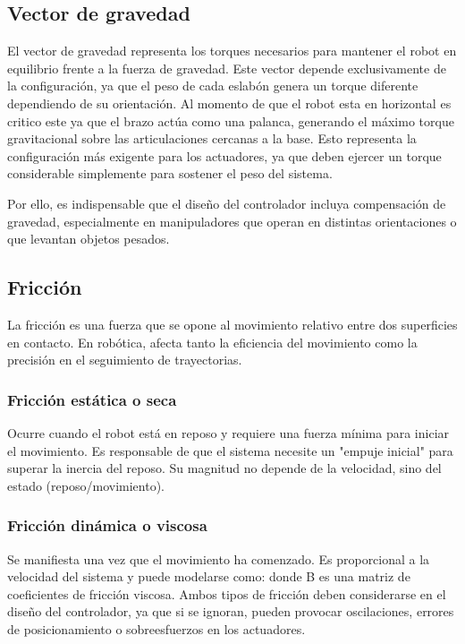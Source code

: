 \subsection{Vector de gravedad}
El vector de gravedad representa los torques necesarios para mantener el robot en equilibrio frente a la fuerza de gravedad. Este vector depende exclusivamente de la configuración, ya que el peso de cada eslabón genera un torque diferente dependiendo de su orientación.
Al momento de que el robot esta en horizontal es critico este ya que el brazo actúa como una palanca, generando el máximo torque gravitacional sobre las articulaciones cercanas a la base. Esto representa la configuración más exigente para los actuadores, ya que deben ejercer un torque considerable simplemente para sostener el peso del sistema.

Por ello, es indispensable que el diseño del controlador incluya compensación de gravedad, especialmente en manipuladores que operan en distintas orientaciones o que levantan objetos pesados.

\subsection{Fricción}
La fricción es una fuerza que se opone al movimiento relativo entre dos superficies en contacto. En robótica, afecta tanto la eficiencia del movimiento como la precisión en el seguimiento de trayectorias.

\subsubsection{Fricción estática o seca}
Ocurre cuando el robot está en reposo y requiere una fuerza mínima para iniciar el movimiento. Es responsable de que el sistema necesite un "empuje inicial" para superar la inercia del reposo. Su magnitud no depende de la velocidad, sino del estado (reposo/movimiento).

\subsubsection{Fricción dinámica o viscosa}
Se manifiesta una vez que el movimiento ha comenzado. Es proporcional a la velocidad del sistema y puede modelarse como:
donde B es una matriz de coeficientes de fricción viscosa.
Ambos tipos de fricción deben considerarse en el diseño del controlador, ya que si se ignoran, pueden provocar oscilaciones, errores de posicionamiento o sobreesfuerzos en los actuadores.

